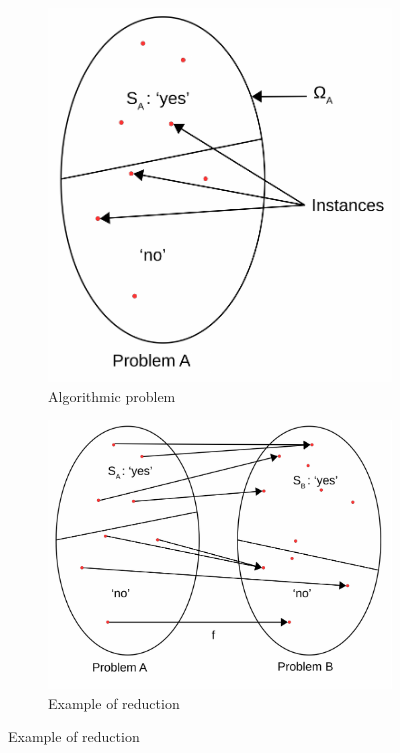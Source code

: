 \begin{figure}[h]
  \centering
  \begin{subfigure}[b]{0.4\textwidth}
    \centering  
    \includegraphics[width=.9\textwidth]{figures/problem.pdf}
    \caption{Algorithmic problem}
    \label{fig:problem}
  \end{subfigure}
  \begin{subfigure}[b]{0.5\textwidth}
    \centering
    \includegraphics[width=\textwidth]{figures/reduction.pdf}
    \caption{Example of reduction}
    \label{fig:reduction}
  \end{subfigure}
\end{figure}


